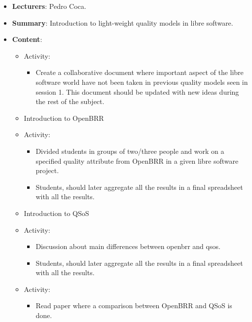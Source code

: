 \documentclass[a4paper]{article}
\begin{document}
\begin{itemize}
 \item \textbf{Lecturers}: Pedro Coca.
 \item \textbf{Summary}: Introduction to light-weight quality models in libre software.
 \item \textbf{Content}:

 \begin{itemize}
      \item Activity:
        \begin{itemize}
          \item Create a collaborative document where important aspect of the libre software world
          have not been taken in previous quality models seen in session 1. This document should 
          be updated with new ideas during the rest of the subject.
        \end{itemize}
      \item Introduction to OpenBRR
      \item Activity: 
        \begin{itemize}
          \item Divided students in groups of two/three people and work on a specified quality attribute from OpenBRR
          in a given libre software project.
          \item Students, should later aggregate all the results in a final spreadsheet with all the results.
        \end{itemize}
       \item Introduction to QSoS
       \item Activity:
         \begin{itemize}
           \item Discussion about main differences between openbrr and qsos.
           \item Students, should later aggregate all the results in a final spreadsheet with all the results.
         \end{itemize}
       \item Activity:
         \begin{itemize}
          \item Read paper where a comparison between OpenBRR and QSoS is done.
        \end{itemize}

 \end{itemize}    

\end{itemize}
\end{document}
